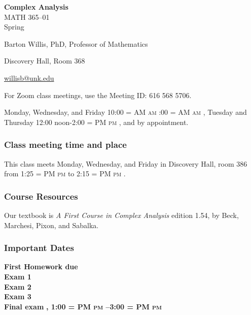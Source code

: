 \documentclass[12pt]{article}
\makeatletter
\newcounter{ex}\setcounter{ex}{0}
\newenvironment{mypar}[2]
  {\begin{list}{}%
    {\setlength\leftmargin{#1}
    \setlength\rightmargin{#2}}
    \item[]}
  {\end{list}}
\renewenvironment{description}[0]{\begin{compactdesc}}{\end{compactdesc}}
\DeclareRobustCommand{\maybefakesc}[1]{%
  \ifnum\pdfstrcmp{\f@series}{\bfdefault}=\z@
    {\fontsize{\dimexpr0.8\dimexpr\f@size pt\relax}{0}\selectfont\uppercase{#1}}%
  \else
    \textsc{#1}%
  \fi
}
\newcommand\AM{\maybefakesc{am}\xspace}
\newcommand\PM{\maybefakesc{pm}\xspace}
\newcommand{\coursename}{Complex Analysis}
\newcommand{\coursenumber}{MATH 365}
\newcommand{\sectionnumber}{01}
\newcommand{\term}{Spring }
\newcommand{\room}{Discovery Hall, room 386}
\newcommand{\meetingtime}{This class meets Monday, Wednesday, and Friday in \room \/  from 1:25\PM to 2:15 \PM.}
\newcommand{\officehours}{Monday, Wednesday, and Friday 10:00\AM-11:00\AM,
    Tuesday and Thursday 12:00 noon-2:00\PM, and by appointment.}
\makeatother
\begin{document}
\cleanlookdateon%
\shortdate
\printyearoff
\large
\begin{center}
    \textbf{\coursename}  \\
    {\coursenumber--\sectionnumber} \\
     {\term \the\year} \\
\end{center}

\vskip0.25in
\normalsize


\begin{center}
\begin{description}
    \item[Instructor:] Barton Willis, PhD, Professor of Mathematics
    \item[Office:]  Discovery Hall, Room 368
    \item[\phone:]   
    \item[\Email:]    \href{mailto:willisb@unk.edu}{willisb@unk.edu}
    \item[Zoom for classes:] For Zoom class meetings, use the Meeting ID: 616 568 5706. 
    \item[Office Hours:] \officehours
  \end{description}
\end{center}

\subsubsection*{Class meeting time and place}

\meetingtime



\subsubsection*{Course Resources}

\noindent Our textbook is \emph{A First Course in Complex Analysis} edition 1.54,  by  
Beck, Marchesi, Pixon, and Sabalka.


\subsubsection*{Important Dates}

\begin{mypar}{0.25in}{0.25in} 

    \textbf{First Homework due} \dotfill  \textbf{}  \\
    \textbf{Exam 1} \dotfill \textbf{}  \\
    \textbf{Exam 2} \dotfill  \textbf{} \\
    \textbf{Exam 3} \dotfill \textbf{} \\
    \textbf{Final exam} \dotfill  \textbf{, 1:00 \PM--3:00 \PM}
\end{mypar}
\end{document}
